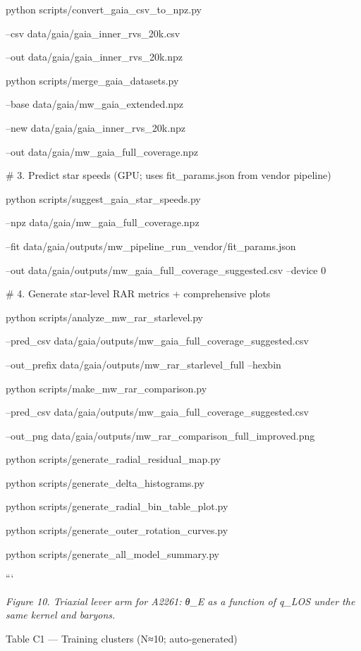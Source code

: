 \documentclass[11pt,a4paper]{article}
\begin{document}
python scripts/convert\_gaia\_csv\_to\_npz.py \

  --csv data/gaia/gaia\_inner\_rvs\_20k.csv \

  --out data/gaia/gaia\_inner\_rvs\_20k.npz


python scripts/merge\_gaia\_datasets.py \

  --base data/gaia/mw\_gaia\_extended.npz \

  --new data/gaia/gaia\_inner\_rvs\_20k.npz \

  --out data/gaia/mw\_gaia\_full\_coverage.npz


\# 3. Predict star speeds (GPU; uses fit\_params.json from vendor pipeline)

python scripts/suggest\_gaia\_star\_speeds.py \

  --npz data/gaia/mw\_gaia\_full\_coverage.npz \

  --fit data/gaia/outputs/mw\_pipeline\_run\_vendor/fit\_params.json \

  --out data/gaia/outputs/mw\_gaia\_full\_coverage\_suggested.csv --device 0


\# 4. Generate star-level RAR metrics + comprehensive plots

python scripts/analyze\_mw\_rar\_starlevel.py \

  --pred\_csv data/gaia/outputs/mw\_gaia\_full\_coverage\_suggested.csv \

  --out\_prefix data/gaia/outputs/mw\_rar\_starlevel\_full --hexbin


python scripts/make\_mw\_rar\_comparison.py \

  --pred\_csv data/gaia/outputs/mw\_gaia\_full\_coverage\_suggested.csv \

  --out\_png data/gaia/outputs/mw\_rar\_comparison\_full\_improved.png


python scripts/generate\_radial\_residual\_map.py

python scripts/generate\_delta\_histograms.py

python scripts/generate\_radial\_bin\_table\_plot.py

python scripts/generate\_outer\_rotation\_curves.py

python scripts/generate\_all\_model\_summary.py

```


\textit{Figure 10. Triaxial lever arm for A2261: θ\_E as a function of q\_LOS under the same kernel and baryons.}


Table C1 — Training clusters (N≈10; auto‑generated)
\end{document}
